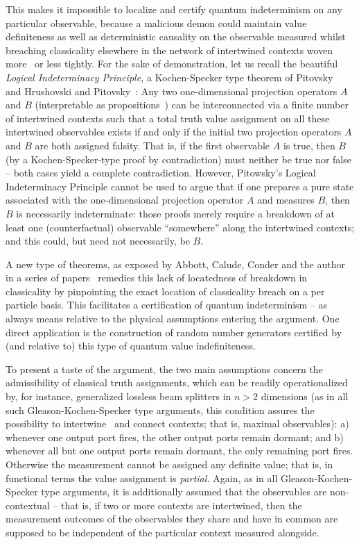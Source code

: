 \documentclass[%
 superscriptaddress,
 preprint,
 showpacs,
 showkeys,
 nofootinbib,
  amsmath,amssymb,
  aps,
  longbibliography,
  floatfix,
 ]{revtex4-1}
\theoremstyle{definition}
\begin{document}
This makes it impossible to localize and certify quantum indeterminism on any particular observable, because a malicious demon could maintain
value definiteness as well as deterministic causality on
the observable measured whilst breaching classicality elsewhere in the network of intertwined contexts woven more~\cite{cabello:210401} or less tightly.
For the sake of demonstration, let us recall the beautiful
{\em Logical Indeterminacy Principle,} a
Kochen-Specker type theorem of Pitovsky~\cite{pitowsky:218} and Hrushovski and Pitovsky~\cite{hru-pit-2003}:
Any two one-dimensional projection operators $A$ and $B$ (interpretable as propositions~\cite{v-neumann-49,birkhoff-36})
can be interconnected via a finite number of intertwined contexts
such that a total truth value assignment on all these intertwined observables exists if and only if
the initial two  projection operators $A$ and $B$ are both assigned falsity.
That is, if the first observable $A$ is true, then $B$ (by a Kochen-Specker-type proof by contradiction)
must neither be true nor false -- both cases yield a complete contradiction.
However, Pitowsky's Logical Indeterminacy Principle cannot be used to argue that if one prepares a pure state
associated with the one-dimensional projection operator $A$ and measures $B$, then $B$ is necessarily indeterminate:
those proofs merely require a breakdown of at least one (counterfactual) observable ``somewhere'' along the intertwined contexts;
and this could, but need not necessarily, be $B$.

A new type of theorems, as exposed by Abbott, Calude, Conder and the author
in a series of papers~\cite{2012-incomput-proofsCJ,PhysRevA.89.032109,2015-AnalyticKS}
remedies this lack of locatedness of breakdown in classicality by pinpointing the exact location of classicality breach on a per particle basis.
This facilitates a certification of quantum indeterminism -- as always means relative to the physical assumptions entering the argument.
One direct application is the construction of random number generators certified by (and relative to) this type of quantum value indefiniteness.

To present a taste of the argument, the two main assumptions concern the admissibility of classical truth assignments,
which can be readily operationalized by, for instance, generalized lossless beam splitters in $n>2$ dimensions
(as in all such Gleason-Kochen-Specker type arguments, this condition assures the possibility to intertwine~\cite{Gleason} and connect contexts; that is, maximal observables):
a) whenever one output port fires, the other output ports remain dormant; and
b) whenever all but one output ports remain dormant, the only remaining port fires.
Otherwise the measurement cannot be assigned any definite value; that is, in functional terms the value assignment
is {\em partial.}
Again, as in all Gleason-Kochen-Specker type arguments, it is additionally assumed that the observables are non-contextual --
that is, if two or more contexts are intertwined, then the measurement outcomes of the observables they share and have in common are supposed
to be independent of the particular context measured alongside.
\end{document}

